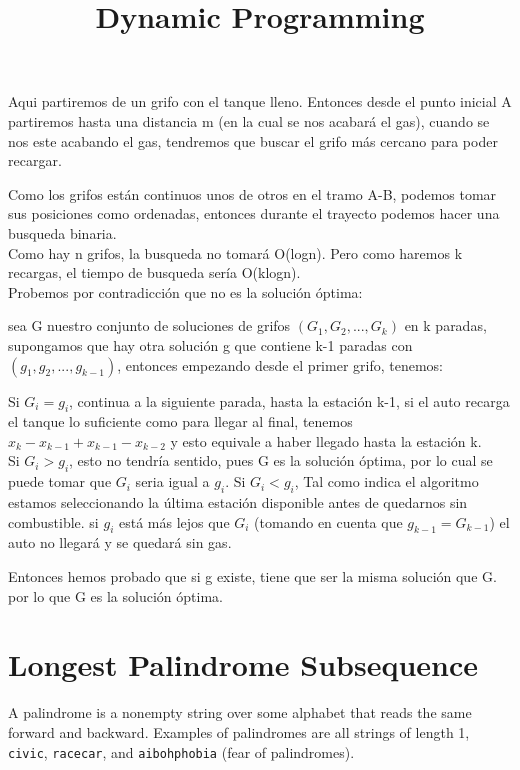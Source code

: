 \documentclass{article}
\begin{document}
Aqui partiremos de un grifo con el tanque lleno. Entonces desde el punto inicial A partiremos hasta una distancia m (en la cual se nos acabará el gas), cuando se nos este acabando el gas, tendremos que buscar el grifo más cercano para poder recargar.

Como los grifos están continuos unos de otros en el tramo A-B, podemos tomar sus posiciones como ordenadas, entonces durante el trayecto podemos hacer una busqueda binaria.\\
Como hay n grifos, la busqueda no tomará O(logn). Pero como haremos k recargas, el tiempo de busqueda sería O(klogn).\\

Probemos por contradicción que no es la solución óptima:

sea G nuestro conjunto de soluciones de grifos $(G_1, G_2, ..., G_k)$ en k paradas, supongamos que hay otra solución g que contiene k-1 paradas con $(g_1, g_2, ..., g_{k-1})$, entonces empezando desde el primer grifo, tenemos: 

Si $G_i = g_i$, continua a la siguiente parada, hasta la estación k-1, si el auto recarga el tanque lo suficiente como para llegar al final, tenemos $x_{k}-x_{k-1}+x_{k-1}-x_{k-2}$ y esto equivale a haber llegado hasta la estación k.\\
Si $G_i > g_i$, esto no tendría sentido, pues G es la solución óptima, por lo cual se puede tomar que $G_i$ seria igual a $g_i$.
Si $G_i < g_i$, Tal como indica el algoritmo estamos seleccionando la última estación disponible antes de quedarnos sin combustible. si $g_i$ está más lejos que $G_i$ (tomando en cuenta que $g_{k-1} = G_{k-1}$) el auto no llegará y se quedará sin gas.

Entonces hemos probado que si g existe, tiene que ser la misma solución que G. por lo que G es la solución óptima.






\title{Dynamic Programming}
\date{}
\maketitle
\setcounter{section}{0}


\section{Longest Palindrome Subsequence}
A palindrome is a nonempty string over some alphabet that reads the same forward and backward. Examples of palindromes are all strings of length 1, \verb|civic|, \verb|racecar|, and \verb|aibohphobia| (fear of palindromes).
\end{document}
